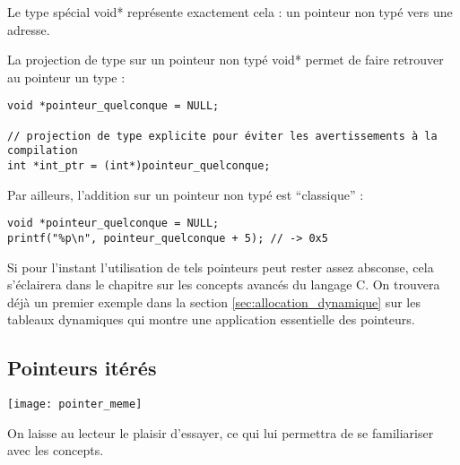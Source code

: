 \documentclass[../../../main.tex]{subfiles}
\begin{document}
Le type spécial \textsf{void*} représente exactement cela : un pointeur non typé vers une adresse.
 
La projection de type sur un pointeur non typé \textsf{void*} permet de faire retrouver au pointeur un type :
\begin{verbatim}
void *pointeur_quelconque = NULL;

// projection de type explicite pour éviter les avertissements à la compilation
int *int_ptr = (int*)pointeur_quelconque; 
\end{verbatim}
Par ailleurs, l'addition sur un pointeur non typé est ``classique'' :
\begin{verbatim}
void *pointeur_quelconque = NULL;
printf("%p\n", pointeur_quelconque + 5); // -> 0x5
\end{verbatim}
Si pour l'instant l'utilisation de tels pointeurs peut rester assez absconse, cela s'éclairera dans le chapitre sur les concepts avancés du langage C. On trouvera déjà un premier exemple dans la section \ref{sec:allocation_dynamique} sur les tableaux dynamiques qui montre une application essentielle des pointeurs.
\subsection{Pointeurs itérés}
\label{sub:pointeurs_it_r_s}
\begin{minipage}{\textwidth}
	\begin{center}
		\texttt{[image: pointer\_meme]}
	\end{center}
\end{minipage}

On laisse au lecteur le plaisir d'essayer, ce qui lui permettra de se familiariser avec les concepts.
\end{document}
